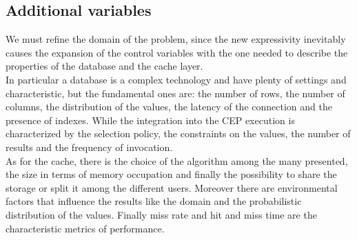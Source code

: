 \subsection{Additional variables}
We must refine the domain of the problem, since the new expressivity inevitably causes the expansion of the control variables with the one needed to describe the properties of the database and the cache layer.\\
In particular a database is a complex technology and have plenty of settings and characteristic, but the fundamental ones are: the number of rows, the number of columns, the distribution of the values, the latency of the connection and the presence of indexes. While the integration into the CEP execution is characterized by the selection policy, the constraints on the values, the number of results and the frequency of invocation.\\
As for the cache, there is the choice of the algorithm among the many presented, the size in terms of memory occupation and finally the possibility to share the storage or split it among the different users. Moreover there are environmental factors that influence the results like the domain and the probabilistic distribution of the values. Finally miss rate and hit and miss time are the characteristic metrics of performance.

